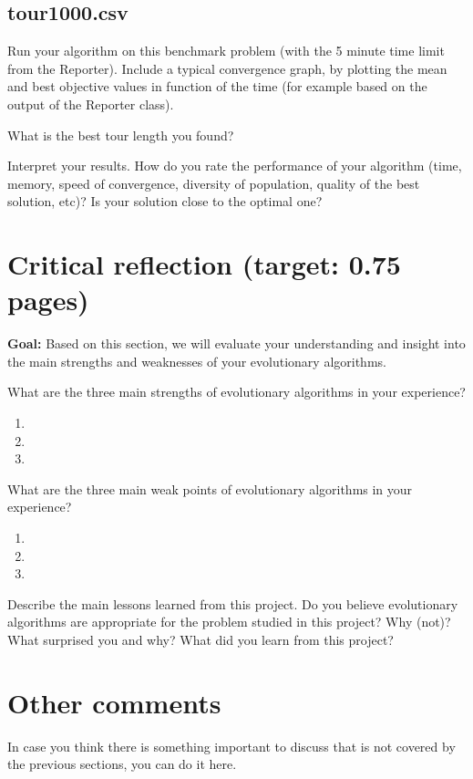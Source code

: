 \documentclass[a4paper,10pt]{article}
\newcommand{\ReplaceMe}[1]{{\color{blue}#1}}
\newcommand{\RemoveMe}[1]{{\color{purple}#1}}
\begin{document}
\subsection{tour1000.csv}

\ReplaceMe{Run your algorithm on this benchmark problem (with the 5 minute time limit from the Reporter). Include a typical convergence graph, by plotting the mean and best objective values in function of the time (for example based on the output of the Reporter class). 

What is the best tour length you found? 

Interpret your results. How do you rate the performance of your algorithm (time, memory, speed of convergence, diversity of population, quality of the best solution, etc)? Is your solution close to the optimal one? }


\section{Critical reflection (target: 0.75 pages)}

\RemoveMe{\textbf{Goal:} Based on this section, we will evaluate your understanding and insight into the main strengths and weaknesses of your evolutionary algorithms.}

\ReplaceMe{What are the three main strengths of evolutionary algorithms in your experience?}

\begin{enumerate}
 \item 
 \item 
 \item 
\end{enumerate}

\ReplaceMe{What are the three main weak points of evolutionary algorithms in your experience?}

\begin{enumerate}
 \item 
 \item 
 \item 
\end{enumerate}

\ReplaceMe{Describe the main lessons learned from this project. Do you believe evolutionary algorithms are appropriate for the problem studied in this project? Why (not)? What surprised you and why? What did you learn from this project?}


\section{Other comments} \label{sec_other}

\ReplaceMe{In case you think there is something important to discuss that is not covered by the previous sections, you can do it here. }

 

\end{document}

